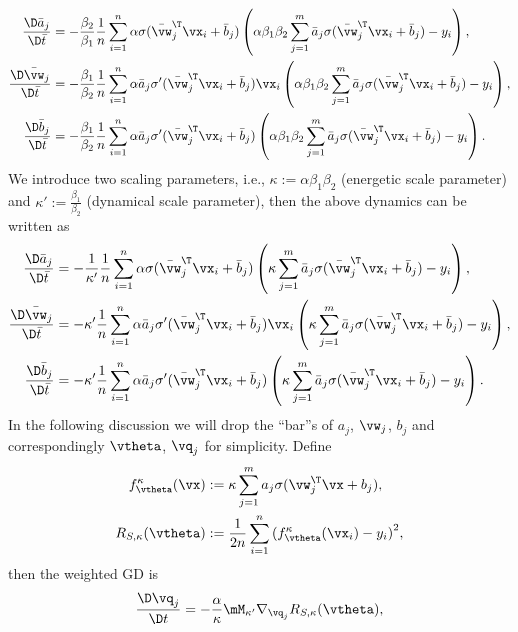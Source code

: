 \documentclass{article}
\begin{document}
\begin{align*}
    \frac{\D \bar{a}_j}{\D \bar{t}}
     & = -\frac{\beta_2}{\beta_1}\frac{1}{n}\sum_{i=1}^n \alpha\sigma(\bar{\vw}_j^\T\vx_i+\bar{b}_j) \left(\alpha\beta_1\beta_2\sum_{j=1}^{m}\bar{a}_j\sigma(\bar{\vw}_j^\T\vx_i+\bar{b}_j)-y_i\right),               \\
    \frac{\D \bar{\vw}_j}{\D \bar{t}}
     & = -\frac{\beta_1}{\beta_2}\frac{1}{n}\sum_{i=1}^n\alpha\bar{a}_j\sigma'(\bar{\vw}_j^\T\vx_i+\bar{b}_j)\vx_i \left(\alpha\beta_1\beta_2\sum_{j=1}^{m}\bar{a}_j\sigma(\bar{\vw}_j^\T\vx_i+\bar{b}_j)-y_i\right), \\
    \frac{\D \bar{b}_j}{\D \bar{t}}
     & = -\frac{\beta_1}{\beta_2}\frac{1}{n}\sum_{i=1}^n\alpha\bar{a}_j\sigma'(\bar{\vw}_j^\T\vx_i+\bar{b}_j) \left(\alpha\beta_1\beta_2\sum_{j=1}^{m}\bar{a}_j\sigma(\bar{\vw}_j^\T\vx_i+\bar{b}_j)-y_i\right).
\end{align*}
We introduce two scaling parameters, i.e., $\kappa:=\alpha\beta_1\beta_2$ (energetic scale parameter) and $\kappa':=\frac{\beta_1}{\beta_2}$ (dynamical scale parameter), then the above dynamics can be written as
\begin{align*}
    \frac{\D \bar{a}_j}{\D \bar{t}}
     & = -\frac{1}{\kappa'}\frac{1}{n}\sum_{i=1}^n \alpha\sigma(\bar{\vw}_j^\T\vx_i+\bar{b}_j) \left(\kappa\sum_{j=1}^{m}\bar{a}_j\sigma(\bar{\vw}_j^\T\vx_i+\bar{b}_j)-y_i\right),     \\
    \frac{\D \bar{\vw}_j}{\D \bar{t}}
     & = -\kappa'\frac{1}{n}\sum_{i=1}^n\alpha\bar{a}_j\sigma'(\bar{\vw}_j^\T\vx_i+\bar{b}_j)\vx_i \left(\kappa\sum_{j=1}^{m}\bar{a}_j\sigma(\bar{\vw}_j^\T\vx_i+\bar{b}_j)-y_i\right), \\
    \frac{\D \bar{b}_j}{\D \bar{t}}
     & = -\kappa'\frac{1}{n}\sum_{i=1}^n\alpha\bar{a}_j\sigma'(\bar{\vw}_j^\T\vx_i+\bar{b}_j) \left(\kappa\sum_{j=1}^{m}\bar{a}_j\sigma(\bar{\vw}_j^\T\vx_i+\bar{b}_j)-y_i\right).
\end{align*}
In the following discussion we will drop the ``bar''s of $a_j$, $\vw_j$, $b_j$ and correspondingly $\vtheta$, $\vq_j$ for simplicity. Define
\begin{align}
    f^{\kappa}_{\vtheta}(\vx)
     & := \kappa\sum_{j=1}^{m}a_j\sigma(\vw_j^\T\vx+b_j),               \\
    R_{S, \kappa}(\vtheta)
     & :=\frac{1}{2n}\sum_{i=1}^n{(f^{\kappa}_{\vtheta}(\vx_i)-y_i)}^2,
\end{align}
then the weighted GD is
\begin{equation}
    \frac{\D\vq_j}{\D t} = -\frac{\alpha}{\kappa}\mM_{\kappa'}\nabla_{\vq_j}R_{S,\kappa}(\vtheta),
\end{equation}
\end{document}
